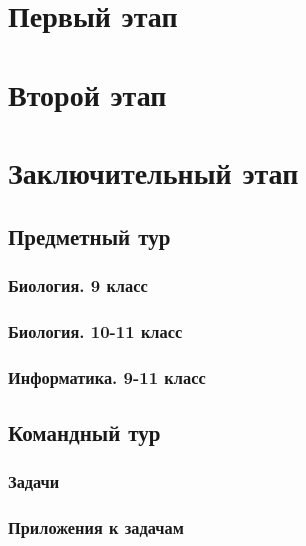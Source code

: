 \documentclass[a4paper,12pt,oneside]{book}
\begin{document}

\setcounter{tocdepth}{1}

\tableofcontents

\part{Первый этап}
\clearpage




\part{Второй этап}
\clearpage




\part{Заключительный этап}

\clearpage
\chapter{Предметный тур}

\section{Биология. 9 класс}


\section{Биология. 10-11 класс}


\section{Информатика. 9-11 класс}


\chapter{Командный тур}

\section{Задачи} 



\section{Приложения к задачам}


\end{document}
